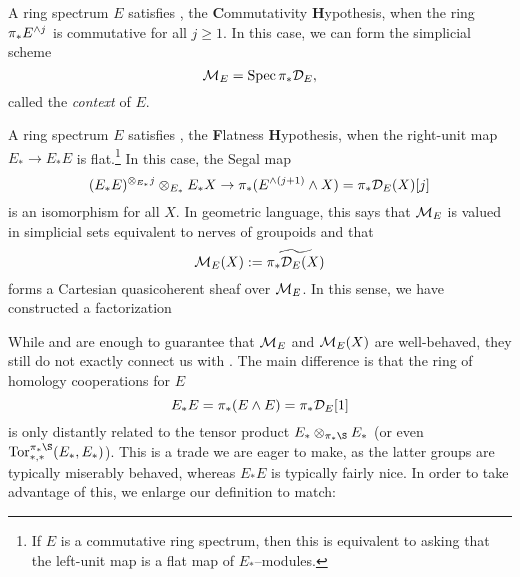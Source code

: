 \begin{definition}
A ring spectrum $E$ satisfies \CH, the \textbf Commutativity \textbf Hypothesis, when the ring $\pi_* E^{\wedge j}$ is commutative for all $j \ge 1$.  In this case, we can form the simplicial scheme \[\mathcal{M}_{E} = \operatorname{Spec} \pi_* \mathcal D_E,\] called the \textit{context} of $E$.
\end{definition}

\begin{definition}
A ring spectrum $E$ satisfies \FH, the \textbf Flatness \textbf Hypothesis, when the right-unit map $E_* \to E_* E$ is flat.\footnote{If $E$ is a commutative ring spectrum, then this is equivalent to asking that the left-unit map is a flat map of $E_*$--modules.}  In this case, the Segal map \[(E_* E)^{\otimes_{E_*} j} \otimes_{E_*} E_* X \to \pi_*(E^{\wedge (j+1)} \wedge X) = \pi_* \mathcal D_E(X)[j]\] is an isomorphism for all $X$.  In geometric language, this says that $\mathcal{M}_{E}$ is valued in simplicial sets equivalent to nerves of groupoids and that \[\mathcal{M}_{E}(X) := \widetilde{\pi_* \mathcal D_E(X)}\] forms a Cartesian quasicoherent sheaf over $\mathcal{M}_{E}$.  In this sense, we have constructed a factorization
\begin{center}
\end{center}
\end{definition}

While {\CH} and {\FH} are enough to guarantee that $\mathcal{M}_{E}$ and $\mathcal{M}_{E}(X)$ are well-behaved, they still do not exactly connect us with .  The main difference is that the ring of homology cooperations for $E$ \[E_*E = \pi_*(E \wedge E) = \pi_* \mathcal D_E[1]\] is only distantly related to the tensor product $E_* \otimes_{\pi_* \S} E_*$ (or even $\Tor^{\pi_* \S}_{*, *}(E_*, E_*)$).  This is a trade we are eager to make, as the latter groups are typically miserably behaved, whereas $E_* E$ is typically fairly nice.  In order to take advantage of this, we enlarge our definition to match:

